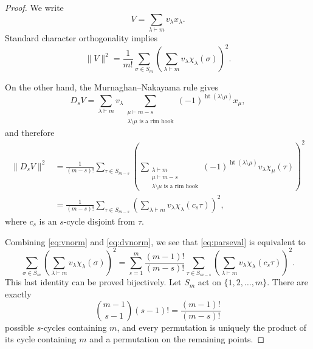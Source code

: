 \documentclass[10pt,a4paper]{amsart}
\DeclareMathOperator{\rht}{ht}
\begin{document}
\begin{proof}
We write
\[
V=\sum_{\lambda\vdash m}v_\lambda x_{\lambda}.
\]
Standard character orthogonality implies
\begin{equation}\label{eq:vnorm}
\|V\|^2=\frac{1}{m!}\sum_{\sigma\in S_m}\left(\sum_{\lambda\vdash m}v_\lambda\chi_{\lambda}(\sigma)\right)^2.
\end{equation}

On the other hand, the Murnaghan--Nakayama rule gives
\begin{equation*}
    D_sV=\sum_{\lambda\vdash m}v_\lambda\sum_{\substack{\mu\vdash m-s\\
\lambda\setminus\mu\text{ is a rim hook}}}
(-1)^{\rht(\lambda\setminus\mu)}x_\mu,
\end{equation*}
and therefore
\begin{align}
    \|D_sV\|^2
    &=\frac{1}{(m-s)!}\sum_{\tau\in S_{m-s}}
      \left(\sum_{\substack{\lambda\vdash m\\ \mu\vdash m-s\\
      \lambda\setminus\mu\text{ is a rim hook}}}
      (-1)^{\rht(\lambda\setminus\mu)}v_\lambda\chi_\mu(\tau)\right)^2\nonumber\\
    &=\frac{1}{(m-s)!}\sum_{\tau\in S_{m-s}}
      \left(\sum_{\lambda\vdash m}v_\lambda\chi_\lambda(c_s\tau)\right)^2,
      \label{eq:dvnorm}
\end{align}
where $c_s$ is an $s$-cycle disjoint from $\tau$.

Combining \eqref{eq:vnorm} and \eqref{eq:dvnorm}, we see that
\eqref{eq:parseval} is equivalent to
\begin{equation*}
    \sum_{\sigma\in S_m}\left(\sum_{\lambda\vdash m}v_\lambda\chi_{\lambda}(\sigma)\right)^2
    =\sum_{s=1}^{m}\frac{(m-1)!}{(m-s)!}\sum_{\tau\in S_{m-s}}
      \left(\sum_{\lambda\vdash m}v_\lambda\chi_\lambda(c_s\tau)\right)^2.
\end{equation*}
This last identity can be proved bijectively.  Let $S_m$ act on
$\{1,2,\dots,m\}$.  There are exactly
\[
 \binom{m-1}{s-1}(s-1)! = \frac{(m-1)!}{(m-s)!}
\]
possible $s$-cycles containing $m$, and every permutation is uniquely
the product of its cycle containing $m$ and a permutation on the
remaining points.
\end{proof}
\end{document}
